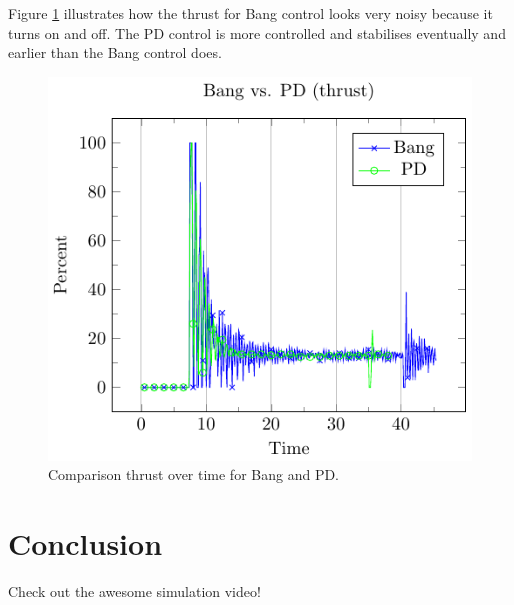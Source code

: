 \documentclass[
]{dtuposter}
\begin{document}
\begin{dtupostercontent}
Figure \ref{fig:thrust} illustrates how the thrust for Bang control looks very noisy because it turns on and off.
The PD control is more controlled and stabilises eventually and earlier than the Bang control does.

\begin{figure}
  \includegraphics[width=\linewidth,origin=c]{thrust.pdf}
  \caption{Comparison thrust over time for Bang and PD.}
  \label{fig:thrust}
\end{figure}

\section{Conclusion}

Check out the awesome simulation video!

\end{dtupostercontent}
\end{document}
